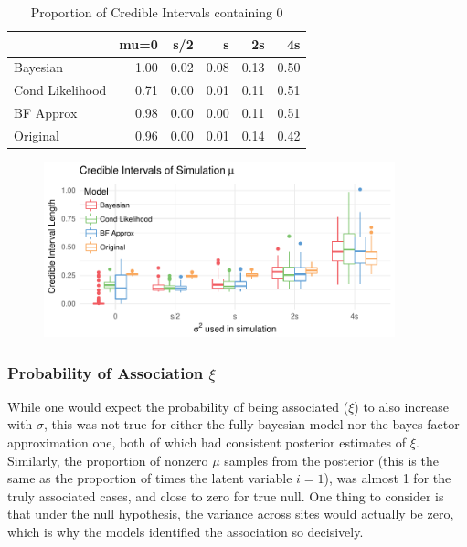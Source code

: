 \documentclass[AMA,STIX1COL]{WileyNJD-v2}\usepackage[]{graphicx}\usepackage[]{color}
\newenvironment{knitrout}{}{} %
\begin{document}
\begin{knitrout}
\color{fgcolor}\begin{table}

\caption{\label{tab:unnamed-chunk-23}Proportion of Credible Intervals containing 0}
\centering
\begin{tabular}[t]{l|r|r|r|r|r}
\hline
  & mu=0 & s/2 & s & 2s & 4s\\
\hline
Bayesian & 1.00 & 0.02 & 0.08 & 0.13 & 0.50\\
\hline
Cond Likelihood & 0.71 & 0.00 & 0.01 & 0.11 & 0.51\\
\hline
BF Approx & 0.98 & 0.00 & 0.00 & 0.11 & 0.51\\
\hline
Original & 0.96 & 0.00 & 0.01 & 0.14 & 0.42\\
\hline
\end{tabular}
\end{table}


\end{knitrout}


\begin{figure}
\begin{knitrout}
\color{fgcolor}

{\centering \includegraphics[width=4in]{figure/unnamed-chunk-24-1} 

}



\end{knitrout}
\end{figure}

\subsubsection{Probability of Association $\xi$}

While one would expect the probability of being associated ($\xi$) to also increase with $\sigma$, this was not true for either the fully bayesian model nor the bayes factor approximation one, both of which had consistent posterior estimates of $\xi$. Similarly, the proportion of nonzero $\mu$ samples from the posterior (this is the same as the proportion of times the latent variable $i = 1$), was almost 1 for the truly associated cases, and close to zero for true null. One thing to consider is that under the null hypothesis, the variance across sites would actually be zero, which is why the models identified the association so decisively.
\end{document}
